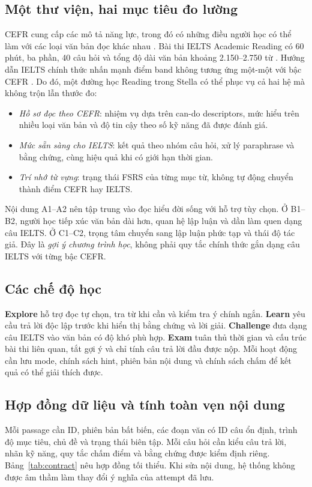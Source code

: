 \documentclass[conference,10pt]{IEEEtran}
\begin{document}
\subsection{Một thư viện, hai mục tiêu đo lường}
CEFR cung cấp các mô tả năng lực, trong đó có những điều người học có thể làm với các loại văn bản đọc khác nhau \cite{coe2020}. Bài thi IELTS Academic Reading có 60 phút, ba phần, 40 câu hỏi và tổng độ dài văn bản khoảng 2.150--2.750 từ \cite{ieltsformat}. Hướng dẫn IELTS chính thức nhấn mạnh điểm band không tương ứng một-một với bậc CEFR \cite{ieltscefr}. Do đó, một đường học Reading trong Stella có thể phục vụ cả hai hệ mà không trộn lẫn thước đo:
\begin{itemize}
\item \emph{Hồ sơ đọc theo CEFR}: nhiệm vụ dựa trên can-do descriptors, mức hiểu trên nhiều loại văn bản và độ tin cậy theo số kỹ năng đã được đánh giá.
\item \emph{Mức sẵn sàng cho IELTS}: kết quả theo nhóm câu hỏi, xử lý paraphrase và bằng chứng, cùng hiệu quả khi có giới hạn thời gian.
\item \emph{Trí nhớ từ vựng}: trạng thái FSRS của từng mục từ, không tự động chuyển thành điểm CEFR hay IELTS.
\end{itemize}

Nội dung A1--A2 nên tập trung vào đọc hiểu đời sống với hỗ trợ tùy chọn. Ở B1--B2, người học tiếp xúc văn bản dài hơn, quan hệ lập luận và dần làm quen dạng câu IELTS. Ở C1--C2, trọng tâm chuyển sang lập luận phức tạp và thái độ tác giả. Đây là \emph{gợi ý chương trình học}, không phải quy tắc chính thức gắn dạng câu IELTS với từng bậc CEFR.

\subsection{Các chế độ học}
\textbf{Explore} hỗ trợ đọc tự chọn, tra từ khi cần và kiểm tra ý chính ngắn. \textbf{Learn} yêu cầu trả lời độc lập trước khi hiển thị bằng chứng và lời giải. \textbf{Challenge} đưa dạng câu IELTS vào văn bản có độ khó phù hợp. \textbf{Exam} tuân thủ thời gian và cấu trúc bài thi liên quan, tắt gợi ý và chỉ tính câu trả lời đầu được nộp. Mỗi hoạt động cần lưu mode, chính sách hint, phiên bản nội dung và chính sách chấm để kết quả có thể giải thích được.

\subsection{Hợp đồng dữ liệu và tính toàn vẹn nội dung}
Mỗi passage cần ID, phiên bản bất biến, các đoạn văn có ID câu ổn định, trình độ mục tiêu, chủ đề và trạng thái biên tập. Mỗi câu hỏi cần kiểu câu trả lời, nhãn kỹ năng, quy tắc chấm điểm và bằng chứng được kiểm định riêng. Bảng~\ref{tab:contract} nêu hợp đồng tối thiểu. Khi sửa nội dung, hệ thống không được âm thầm làm thay đổi ý nghĩa của attempt đã lưu.
\end{document}
